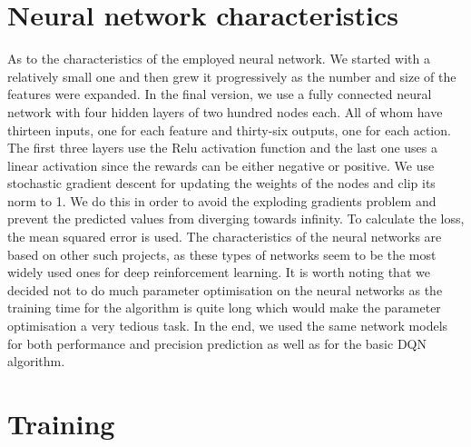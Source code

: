 \section{Neural network characteristics}
As to the characteristics of the employed neural network. We started with a relatively small one and then grew it progressively as the number and size of the features were expanded. In the final version, we use a fully connected neural network with four hidden layers of two hundred nodes each. All of whom have thirteen inputs, one for each feature and thirty-six outputs, one for each action. The first three layers use the Relu activation function and the last one uses a linear activation since the rewards can be either negative or positive. We use stochastic gradient descent for updating the weights of the nodes and clip its norm to 1. We do this in order to avoid the exploding gradients problem and prevent the predicted values from diverging towards infinity. To calculate the loss, the mean squared error is used. The characteristics of the neural networks are based on other such projects, as these types of networks seem to be the most widely used ones for deep reinforcement learning. It is worth noting that we decided not to do much parameter optimisation on the neural networks as the training time for the algorithm is quite long which would make the parameter optimisation a very tedious task. In the end, we used the same network models for both performance and precision prediction as well as for the basic DQN algorithm.
\section{Training}

